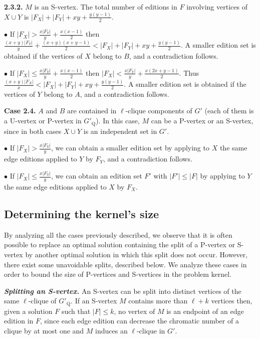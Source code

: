 \documentclass[12pt]{article}
\begin{document}
\textbf{2.3.2.} $M$ is an S-vertex. The total number of editions
in $F$ involving vertices of $X \cup Y$ is
$|F_X|+|F_Y|+xy+\frac{y(y-1)}{2}$.

$\bullet$ If $|F_X| > \frac{x|F_Y|}{y}+ \frac{x(x-1)}{2}$ then
$\frac{(x+y)|F_Y|}{y} + \frac{(x+y)(x+y-1)}{2}< |F_X| + |F_Y| + xy
+  \frac{y(y-1)}{2}$. A smaller edition set is obtained if
the vertices of $X$ belong to $B$, and a contradiction follows.

$\bullet$ If $|F_X| \leq \frac{x|F_Y|}{y}+ \frac{x(x-1)}{2}$ then
$|F_X| < \frac{x|F_Y|}{y}+ \frac{x(2x+y-1)}{2}$. Thus
$\frac{(x+y)|F_X|}{x}< |F_X| + |F_Y| + xy +  \frac{y(y-1)}{2}$. A
smaller edition set is obtained if the vertices of $Y$ belong
to $A$, and a contradiction follows.

\textbf{Case 2.4.} $A$ and $B$ are contained in $\ell$-clique
components of $G'$ (each of them is a U-vertex or P-vertex in
$G'_{\mathrm Q}$). In this case, $M$ can be a P-vertex or an
S-vertex, since in both cases $X \cup Y$ is an independent
set in $G'$.

$\bullet$ If $|F_X| > \frac{x|F_Y|}{y}$, we can obtain a smaller
edition set by applying to $X$ the same edge editions applied
to $Y$ by $F_Y$, and a contradiction follows.

$\bullet$ If  $|F_X| \leq \frac{x|F_Y|}{y}$, we can obtain an edition set $F'$ with $|F'|\leq|F|$ by applying to $Y$ the same
edge editions applied to $X$ by $F_X$.


\subsection{Determining the kernel's size}

By analyzing all the cases previously described, we observe that it is
often possible to replace an optimal solution containing the
split of a P-vertex or S-vertex by another optimal solution in
which this split does not occur. However, there exist some
unavoidable splits, described below. We analyze these
cases in order to bound the size of P-vertices and S-vertices in
the problem kernel.


\emph{\textbf{Splitting an S-vertex.}} An S-vertex can be
split into distinct vertices of the same $\ell$-clique of
$G'_{\mathrm Q}$. If an S-vertex $M$ contains more than $\ell+k$
vertices then, given a solution $F$ such that $|F|\leq k$, no
vertex of $M$ is an endpoint of an edge edition in $F$, since each
edge edition can decrease the chromatic number of a clique by at
most one and $M$ induces an $\ell$-clique in $G'$.
\end{document}
